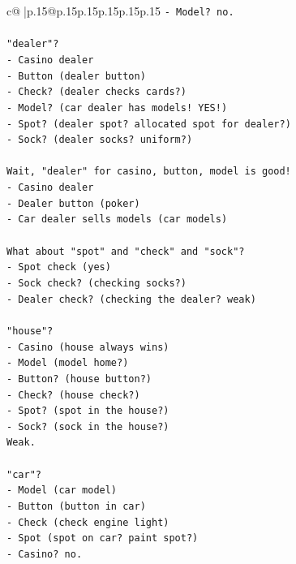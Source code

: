 \documentclass{article}
\begin{document}
{\begin{supertabular}{c@{$\;$}|p{.15\linewidth}@{}p{.15\linewidth}p{.15\linewidth}p{.15\linewidth}p{.15\linewidth}p{.15\linewidth}}
{{{\texttt{{-} Model? no.} \\
\\ 
\texttt{"dealer"?} \\
\texttt{{-} Casino dealer} \\
\texttt{{-} Button (dealer button)} \\
\texttt{{-} Check? (dealer checks cards?)} \\
\texttt{{-} Model? (car dealer has models! YES!)} \\
\texttt{{-} Spot? (dealer spot? allocated spot for dealer?)} \\
\texttt{{-} Sock? (dealer socks? uniform?)} \\
\\ 
\texttt{Wait, "dealer" for casino, button, model is good!} \\
\texttt{{-} Casino dealer} \\
\texttt{{-} Dealer button (poker)} \\
\texttt{{-} Car dealer sells models (car models)} \\
\\ 
\texttt{What about "spot" and "check" and "sock"?} \\
\texttt{{-} Spot check (yes)} \\
\texttt{{-} Sock check? (checking socks?)} \\
\texttt{{-} Dealer check? (checking the dealer? weak)} \\
\\ 
\texttt{"house"?} \\
\texttt{{-} Casino (house always wins)} \\
\texttt{{-} Model (model home?)} \\
\texttt{{-} Button? (house button?)} \\
\texttt{{-} Check? (house check?)} \\
\texttt{{-} Spot? (spot in the house?)} \\
\texttt{{-} Sock? (sock in the house?)} \\
\texttt{Weak.} \\
\\ 
\texttt{"car"?} \\
\texttt{{-} Model (car model)} \\
\texttt{{-} Button (button in car)} \\
\texttt{{-} Check (check engine light)} \\
\texttt{{-} Spot (spot on car? paint spot?)} \\
\texttt{{-} Casino? no.} \\
}}}
\end{supertabular}}
\end{document}
